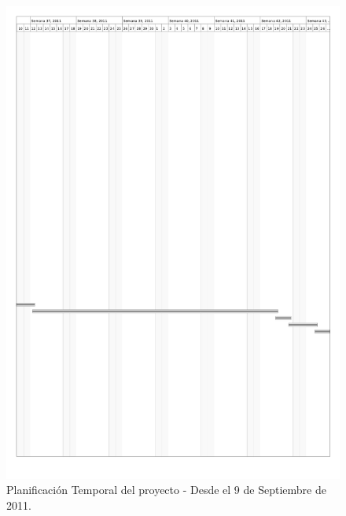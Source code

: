 \pagebreak
\begin{figure}[H]
\begin{center}
\includegraphics[width=15.5cm]{planificacion_graphvisualx_4.png}
\caption{Planificación Temporal del proyecto - Desde el 9 de Septiembre de 2011.}
\end{center}
\end{figure}

